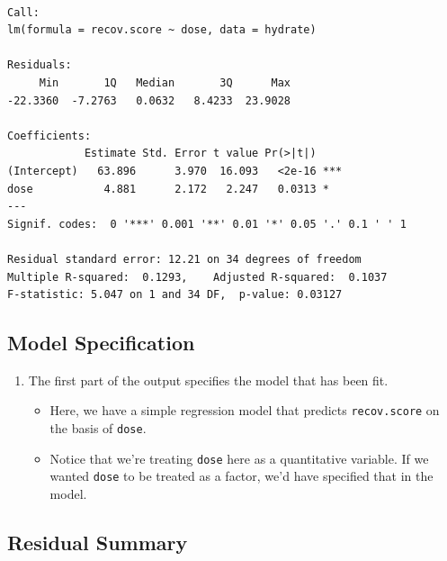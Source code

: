 \documentclass[
]{book}
\providecommand{\tightlist}{%
  \setlength{\itemsep}{0pt}\setlength{\parskip}{0pt}}
\begin{document}
\begin{verbatim}

Call:
lm(formula = recov.score ~ dose, data = hydrate)

Residuals:
     Min       1Q   Median       3Q      Max 
-22.3360  -7.2763   0.0632   8.4233  23.9028 

Coefficients:
            Estimate Std. Error t value Pr(>|t|)    
(Intercept)   63.896      3.970  16.093   <2e-16 ***
dose           4.881      2.172   2.247   0.0313 *  
---
Signif. codes:  0 '***' 0.001 '**' 0.01 '*' 0.05 '.' 0.1 ' ' 1

Residual standard error: 12.21 on 34 degrees of freedom
Multiple R-squared:  0.1293,	Adjusted R-squared:  0.1037 
F-statistic: 5.047 on 1 and 34 DF,  p-value: 0.03127
\end{verbatim}

\hypertarget{model-specification}{%
\subsection{Model Specification}\label{model-specification}}

\begin{enumerate}
\def\labelenumi{\arabic{enumi}.}
\tightlist
\item
  The first part of the output specifies the model that has been fit.

  \begin{itemize}
  \tightlist
  \item
    Here, we have a simple regression model that predicts \texttt{recov.score} on the basis of \texttt{dose}.
  \item
    Notice that we're treating \texttt{dose} here as a quantitative variable. If we wanted \texttt{dose} to be treated as a factor, we'd have specified that in the model.
  \end{itemize}
\end{enumerate}

\hypertarget{residual-summary}{%
\subsection{Residual Summary}\label{residual-summary}}
\end{document}
